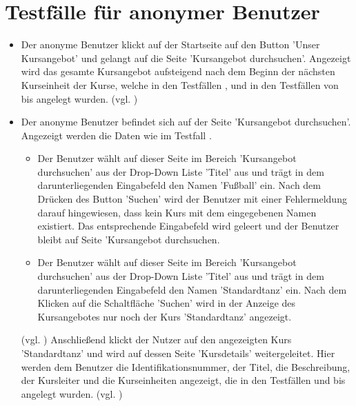 \documentclass[a4paper]{scrreprt}
\newcounter{Lc}
\newcounter{Hc}
\newcommand{\stepHc}{\stepcounter{Hc}\setcounter{Lc}{0}}
\begin{document}
	\section{Testfälle für anonymer Benutzer}
			\stepHc
			\begin{itemize}
				\item {} 
				 Der anonyme Benutzer klickt auf der Startseite auf den Button 'Unser Kursangebot' und gelangt auf die Seite 'Kursangebot durchsuchen'. Angezeigt wird das gesamte Kursangebot aufsteigend nach dem Beginn der nächsten Kurseinheit der Kurse, welche in den Testfällen ,  und in den Testfällen von  bis  angelegt wurden. (vgl. ) 
				 
				 \item {} 
				 Der anonyme Benutzer befindet sich auf der Seite 'Kursangebot durchsuchen'. Angezeigt werden die Daten wie im Testfall . 
					 \begin{itemize}
					 \item Der Benutzer wählt auf dieser Seite im Bereich 'Kursangebot durchsuchen' aus der Drop-Down Liste 'Titel' aus und trägt in dem darunterliegenden Eingabefeld den Namen 'Fußball' ein. Nach dem Drücken des Button 'Suchen' wird der Benutzer mit einer Fehlermeldung darauf hingewiesen, dass kein Kurs mit dem eingegebenen Namen existiert. Das entsprechende Eingabefeld wird geleert und der Benutzer bleibt auf Seite 'Kursangebot durchsuchen.
					 
					 \item  Der Benutzer wählt auf dieser Seite im Bereich 'Kursangebot durchsuchen' aus der Drop-Down Liste 'Titel' aus und trägt in dem darunterliegenden Eingabefeld den Namen 'Standardtanz' ein. Nach dem Klicken auf die Schaltfläche 'Suchen' wird in der Anzeige des Kursangebotes nur noch der Kurs 'Standardtanz' angezeigt.
					\end{itemize}
				(vgl. )	
				Anschließend klickt der Nutzer auf den angezeigten Kurs 'Standardtanz' und wird auf dessen Seite 'Kursdetails' weitergeleitet. Hier werden dem Benutzer die Identifikationsnummer, der Titel, die Beschreibung, der Kursleiter und die Kurseinheiten angezeigt, die in den Testfällen  und  bis  angelegt wurden. (vgl. ) 
				

\end{itemize}
\end{document}
